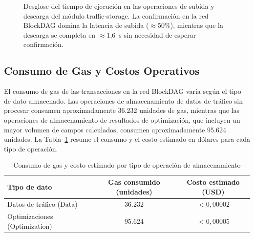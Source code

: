 \begin{figure}[htbp]
\centering
{}
\caption{Desglose del tiempo de ejecución en las operaciones de subida y descarga del
módulo traffic-storage. La confirmación en la red BlockDAG domina la latencia
de subida ($\approx$50\%), mientras que la descarga se completa en $\approx$1,6~s
sin necesidad de esperar confirmación.}
\label{fig:storage_pipeline}
\end{figure}

\subsection{Consumo de Gas y Costos Operativos}
\label{subsec:storage_gas}

El consumo de gas de las transacciones en la red BlockDAG varía según el tipo de dato
almacenado. Las operaciones de almacenamiento de datos de tráfico sin procesar consumen
aproximadamente 36.232 unidades de gas, mientras que las
operaciones de almacenamiento de resultados de optimización,
que incluyen un mayor volumen de campos calculados, consumen aproximadamente
95.624 unidades. La Tabla~\ref{tab:storage_gas} resume el consumo y el costo estimado
en dólares para cada tipo de operación.

\begin{table}[htbp]
\renewcommand{\arraystretch}{1.3}
\caption{Consumo de gas y costo estimado por tipo de operación de almacenamiento}
\label{tab:storage_gas}
\centering
\footnotesize
\begin{tabular}{lcc}
\hline
\textbf{Tipo de dato}         & \textbf{Gas consumido (unidades)} & \textbf{Costo estimado (USD)} \\
\hline
Datos de tráfico (Data)         & 36.232 & $< 0{,}00002$ \\
Optimizaciones (Optimization)   & 95.624 & $< 0{,}00005$ \\
\hline
\end{tabular}
\end{table}

